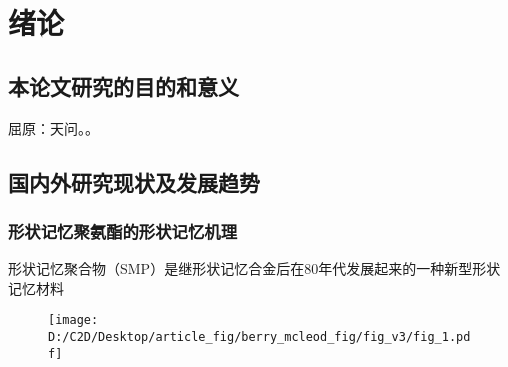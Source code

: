 

\label{第一章开始}
\chapter{绪论}

\section{本论文研究的目的和意义}

屈原：天问。\cite{berryOpticalSingularitiesBirefringent2003,ossikovskiConstitutiveRelationsOptically2021}。

\section{国内外研究现状及发展趋势}

\subsection{形状记忆聚氨酯的形状记忆机理}

形状记忆聚合物（SMP）是继形状记忆合金后在80年代发展起来的一种新型形状记忆材料

\begin{figure}[htbp]
	\centering
	\texttt{[image: D:/C2D/Desktop/article\_fig/berry\_mcleod\_fig/fig\_v3/fig\_1.pdf]}
\end{figure}


